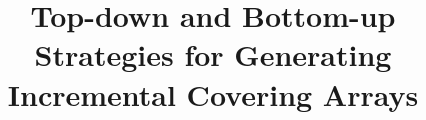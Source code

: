 \documentclass[conference]{IEEEtran}
\theoremstyle{definition}
\begin{document}
%
\title{Top-down and Bottom-up Strategies for Generating Incremental Covering Arrays}


\end{document}
